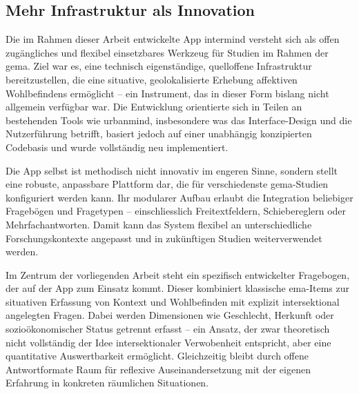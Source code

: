 \subsection{Mehr Infrastruktur als Innovation}

Die im Rahmen dieser Arbeit entwickelte App \gls{intermind} versteht sich als offen zugängliches und flexibel einsetzbares Werkzeug für Studien im Rahmen der \acrshort{gema}. Ziel war es, eine technisch eigenständige, quelloffene Infrastruktur bereitzustellen, die eine situative, geolokalisierte Erhebung affektiven Wohlbefindens ermöglicht -- ein Instrument, das in dieser Form bislang nicht allgemein verfügbar war. Die Entwicklung orientierte sich in Teilen an bestehenden Tools wie \gls{urbanmind}, insbesondere was das Interface-Design und die Nutzerführung betrifft, basiert jedoch auf einer unabhängig konzipierten Codebasis und wurde vollständig neu implementiert.

Die App selbst ist methodisch nicht innovativ im engeren Sinne, sondern stellt eine robuste, anpassbare Plattform dar, die für verschiedenste \acrshort{gema}-Studien konfiguriert werden kann. Ihr modularer Aufbau erlaubt die Integration beliebiger Fragebögen und Fragetypen -- einschliesslich Freitextfeldern, Schiebereglern oder Mehrfachantworten. Damit kann das System flexibel an unterschiedliche Forschungskontexte angepasst und in zukünftigen Studien weiterverwendet werden.

Im Zentrum der vorliegenden Arbeit steht ein spezifisch entwickelter Fragebogen, der auf der App zum Einsatz kommt. Dieser kombiniert klassische \gls{ema}-Items zur situativen Erfassung von Kontext und Wohlbefinden mit explizit intersektional angelegten Fragen. Dabei werden Dimensionen wie Geschlecht, Herkunft oder sozioökonomischer Status getrennt erfasst -- ein Ansatz, der zwar theoretisch nicht vollständig der Idee intersektionaler Verwobenheit entspricht, aber eine quantitative Auswertbarkeit ermöglicht. Gleichzeitig bleibt durch offene Antwortformate Raum für reflexive Auseinandersetzung mit der eigenen Erfahrung in konkreten räumlichen Situationen.

